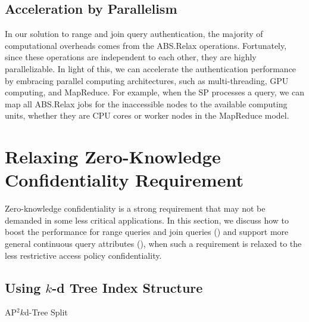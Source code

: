 \subsection{Acceleration by Parallelism}
In our solution to range and join query authentication, the majority of computational overheads comes from the \textsf{ABS.Relax} operations. Fortunately, since these operations are independent to each other, they are highly parallelizable. In light of this, we can accelerate the authentication performance by embracing parallel computing architectures, such as multi-threading, GPU computing, and MapReduce. For example, when the SP processes a query, we can map all \textsf{ABS.Relax} jobs for the inaccessible nodes to the available computing units, whether they are CPU cores or worker nodes in the MapReduce model.

\section{Relaxing Zero-Knowledge Confidentiality Requirement}\label{sec:access-control:relaxing-zero-knowledge}

Zero-knowledge confidentiality is a strong requirement that may not be demanded in some less critical applications. In this section, we discuss how to boost the performance for range queries and join queries () and support more general continuous query attributes (), when such a requirement is relaxed to the less restrictive access policy confidentiality.

\subsection{Using $k$-d Tree Index Structure}\label{sec:access-control:kd-tree}

\begin{algorithm}[t]
    \caption{AP$^2k$d-Tree Split}\label{alg:access-control:kd-split}
\end{algorithm}

